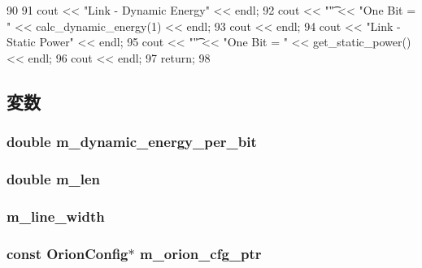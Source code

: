 \begin{DoxyCode}
90 {
91     cout << "Link - Dynamic Energy" << endl;
92     cout << "\t" << "One Bit = " << calc_dynamic_energy(1) << endl;
93     cout << endl;
94     cout << "Link - Static Power" << endl;
95     cout << "\t" << "One Bit = " << get_static_power() << endl;
96     cout << endl;
97     return;
98 }
\end{DoxyCode}


\subsection{変数}
\hypertarget{classOrionLink_a8fee722d1b0994db54aa86ad00575a3d}{
\subsubsection[{m\_\-dynamic\_\-energy\_\-per\_\-bit}]{\setlength{\rightskip}{0pt plus 5cm}double {\bf m\_\-dynamic\_\-energy\_\-per\_\-bit}}}
\label{classOrionLink_a8fee722d1b0994db54aa86ad00575a3d}
\hypertarget{classOrionLink_a33df3a90750eb311de09e793d9aaa294}{
\subsubsection[{m\_\-len}]{\setlength{\rightskip}{0pt plus 5cm}double {\bf m\_\-len}}}
\label{classOrionLink_a33df3a90750eb311de09e793d9aaa294}
\hypertarget{classOrionLink_add4c54b54475120d0e1547d3a9c48f44}{
\subsubsection[{m\_\-line\_\-width}]{ {\bf m\_\-line\_\-width}}}
\label{classOrionLink_add4c54b54475120d0e1547d3a9c48f44}
\hypertarget{classOrionLink_a84de60ae1f7ca812df5347e27a658c77}{
\subsubsection[{m\_\-orion\_\-cfg\_\-ptr}]{\setlength{\rightskip}{0pt plus 5cm}const {\bf OrionConfig}$\ast$ {\bf m\_\-orion\_\-cfg\_\-ptr}}}

